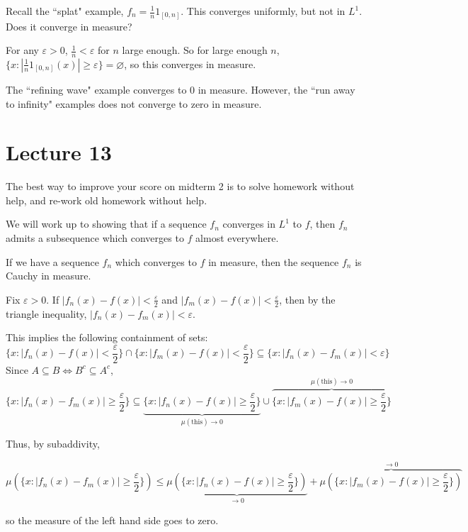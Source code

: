 \documentclass[x11names,reqno,14pt]{extarticle}
\begin{document}
\exm

Recall the ``splat" example, $f_n = \frac{1}{n}1_{[0, n]}$. This converges uniformly, but not in $L^1$. Does it converge in measure? 

For any $\varepsilon > 0$, $\frac{1}{n} < \varepsilon$ for $n$ large enough. So for large enough $n$, $\{x : |\frac{1}{n}1_{[0, n]}(x)| \geq \varepsilon\} = \varnothing$, so this converges in measure. 

The ``refining wave" example converges to 0 in measure. However, the ``run away to infinity" examples does not converge to zero in measure. 

\section*{Lecture 13}

The best way to improve your score on midterm 2 is to solve homework without help, and re-work old homework without help. 

We will work up to showing that if a sequence $f_n$ converges in $L^1$ to $f$, then $f_n$ admits a subsequence which converges to $f$ almost everywhere. 

\rem

If we have a sequence $f_n$ which converges to $f$ in measure, then the sequence $f_n$ is Cauchy in measure. 

\proof

Fix $\varepsilon>0$. If $|f_n(x) - f(x)|< \frac{\varepsilon}{2}$ and $|f_m(x) - f(x)| < \frac{\varepsilon}{2}$, then by the triangle inequality, $|f_n(x) - f_m(x)| < \varepsilon$. 

This implies the following containment of sets:
\[
\{x : |f_n(x) - f(x)| < \frac{\varepsilon}{2}\} \cap \{x: |f_m(x) - f(x)| < \frac{\varepsilon}{2}\} \subseteq \{x: |f_n(x) - f_m(x)| < \varepsilon\}
\]
Since $A \subseteq B \iff B^c \subseteq A^c$, 
\[
\{x: |f_n(x) - f_m(x)| \geq \frac{\varepsilon}{2}\} \subseteq\underbrace{\{x: |f_n(x) - f(x)| \geq \frac{\varepsilon}{2}\}}_{\mu(\text{this})\to0} \cup \overbrace{\{x: |f_m(x) - f(x)| \geq \frac{\varepsilon}{2}\}}^{\mu(\text{this})\to0}
\]

Thus, by subaddivity, 

\[
\mu(\{x: |f_n(x) - f_m(x)| \geq \frac{\varepsilon}{2}\}) \leq \underbrace{\mu(\{x: |f_n(x) - f(x)| \geq \frac{\varepsilon}{2}\})}_{\to0} + \overbrace{\mu(\{x: |f_m(x) - f(x)| \geq \frac{\varepsilon}{2}\})}^{\to0}
\]

so the measure of the left hand side goes to zero. 
\end{document}

